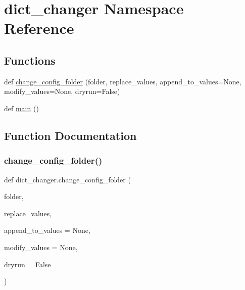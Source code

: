 \hypertarget{namespacedict__changer}{}\section{dict\+\_\+changer Namespace Reference}
\label{namespacedict__changer}
\subsection*{Functions}
\begin{DoxyCompactItemize}
\item 
def \mbox{\hyperlink{namespacedict__changer_a382eb9d6c06cff1b78fa410c33f36ee5}{change\+\_\+config\+\_\+folder}} (folder, replace\+\_\+values, append\+\_\+to\+\_\+values=None, modify\+\_\+values=None, dryrun=False)
\item 
def \mbox{\hyperlink{namespacedict__changer_a5273383344c4ecafa4b588d5710e09e0}{main}} ()
\end{DoxyCompactItemize}


\subsection{Function Documentation}
\mbox{\label{namespacedict__changer_a382eb9d6c06cff1b78fa410c33f36ee5}} 
\subsubsection{\texorpdfstring{change\_config\_folder()}{change\_config\_folder()}}
{\footnotesize\ttfamily def dict\+\_\+changer.\+change\+\_\+config\+\_\+folder (\begin{DoxyParamCaption}\item[{}]{folder,  }\item[{}]{replace\+\_\+values,  }\item[{}]{append\+\_\+to\+\_\+values = {\ttfamily None},  }\item[{}]{modify\+\_\+values = {\ttfamily None},  }\item[{}]{dryrun = {\ttfamily False} }\end{DoxyParamCaption})}

